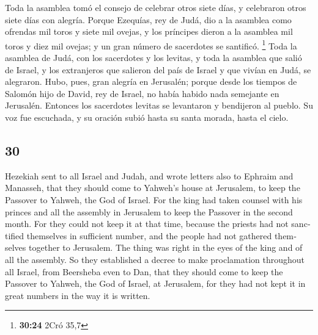 \begin{paracol}{2}
 Toda la asamblea tomó el consejo de celebrar otros siete
días, y celebraron otros siete días con alegría.  Porque
Ezequías, rey de Judá, dio a la asamblea como ofrendas mil toros y siete
mil ovejas, y los príncipes dieron a la asamblea mil toros y diez mil
ovejas; y un gran número de sacerdotes se santificó. \footnote{\textbf{30:24}
  2Cró 35,7}  Toda la asamblea de Judá, con los
sacerdotes y los levitas, y toda la asamblea que salió de Israel, y los
extranjeros que salieron del país de Israel y que vivían en Judá, se
alegraron.  Hubo, pues, gran alegría en Jerusalén; porque
desde los tiempos de Salomón hijo de David, rey de Israel, no había
habido nada semejante en Jerusalén.  Entonces los
sacerdotes levitas se levantaron y bendijeron al pueblo. Su voz fue
escuchada, y su oración subió hasta su santa morada, hasta el cielo.

\switchcolumn
\begin{otherlanguage}{english}

\hypertarget{section-59}{%
\section{30}\label{section-59}}

 Hezekiah sent to all Israel and Judah, and wrote letters
also to Ephraim and Manasseh, that they should come to Yahweh's house at
Jerusalem, to keep the Passover to Yahweh, the God of Israel.
 For the king had taken counsel with his princes and all
the assembly in Jerusalem to keep the Passover in the second month.
 For they could not keep it at that time, because the
priests had not sanctified themselves in sufficient number, and the
people had not gathered themselves together to Jerusalem. 
The thing was right in the eyes of the king and of all the assembly.
 So they established a decree to make proclamation
throughout all Israel, from Beersheba even to Dan, that they should come
to keep the Passover to Yahweh, the God of Israel, at Jerusalem, for
they had not kept it in great numbers in the way it is written.


\end{otherlanguage}
\end{paracol}
